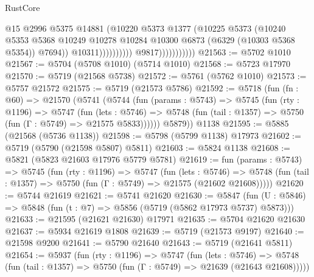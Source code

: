 \begin{lexlean}{RustCore}
\begin{coremodule}
                                            @15
                                            @2996
                                            @5375
                                            @14881
                                            (@10220
                                              @5373
                                              @1377
                                              (@10225
                                                @5373
                                                (@10240
                                                  @5353
                                                  @5368
                                                  @10249
                                                  @10278
                                                  @10284
                                                  @10300
                                                  @6873
                                                  (@6329 (@10303 @5368 @5354))
                                                  @7694))
                                              @10311))))))))))
                          @9817)))))))))))
@21563 := @5702 @1010
@21567 := @5704 (@5708 @1010) (@5714 @1010)
@21568 := @5723 @17970
@21570 := @5719 (@21568 @5738)
@21572 := @5761 (@5762 @1010)
@21573 := @5757 @21572
@21575 := @5719 (@21573 @5786)
@21592 := @5718
    (fun (fn : @60) =>
    @21570
      (@5741
        (@5744
          (fun (params : @5743) =>
          @5745
            (fun (rty : @1196) =>
            @5747
              (fun (lets : @5746) =>
              @5748 (fun (tail : @1357) => @5750 (fun (Γ : @5749) => @21575 @5833))))))
        @5879))
    @1138
@21595 := @5885 (@21568 (@5736 @1138))
@21598 := @5798 (@5799 @1138) @17973
@21602 := @5719 (@5790 (@21598 @5807) @5811)
@21603 := @5824 @1138
@21608 := @5821 (@5823 @21603 @17976 @5779 @5781)
@21619 := fun (params : @5743) =>
  @5745
    (fun (rty : @1196) =>
    @5747
      (fun (lets : @5746) =>
      @5748 (fun (tail : @1357) => @5750 (fun (Γ : @5749) => @21575 (@21602 @21608)))))
@21620 := @5744 @21619
@21621 := @5741 @21620
@21630 := @5847
    (fun (U : @5846) => @5848 (fun (t : @7) => @5856 (@5719 (@5862 @17973 @5737) @5873)))
@21633 := @21595 (@21621 @21630) @17971
@21635 := @5704 @21620 @21630
@21637 := @5934 @21619 @1808
@21639 := @5719 (@21573 @9197)
@21640 := @21598 @9200
@21641 := @5790 @21640
@21643 := @5719 (@21641 @5811)
@21654 := @5937
    (fun (rty : @1196) =>
    @5747
      (fun (lets : @5746) =>
      @5748 (fun (tail : @1357) => @5750 (fun (Γ : @5749) => @21639 (@21643 @21608)))))

\end{coremodule}
\end{lexlean}
